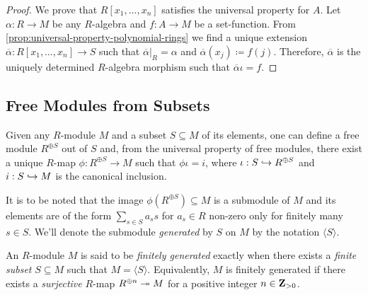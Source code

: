 \begin{proof}
    We prove that \(R[x_1, \dots, x_n]\) satisfies the universal property for
    \(A\). Let \(\alpha: R \to M\) be any \(R\)-algebra and \(f: A \to M\) be a
    set-function. From \cref{prop:universal-property-polynomial-rings} we find a
    unique extension \(\overline{\alpha}: R[x_1, \dots, x_n] \to S\) such that
    \(\overline{\alpha}|_R = \alpha\) and \(\overline{\alpha}(x_j) \coloneq
    f(j)\). Therefore, \(\overline{\alpha}\) is the uniquely determined
    \(R\)-algebra morphism such that \(\overline{\alpha} \iota = f\).
\end{proof}

\subsection{Free Modules from Subsets}

Given any \(R\)-module \(M\) and a subset \(S \subseteq M\) of its elements, one
can define a free module \(R^{\oplus S}\) out of \(S\) and, from the universal
property of free modules, there exist a unique \(R\)-map \(\phi: R^{\oplus S}
\to M\) such that \(\phi \iota = i\), where \(\iota: S \hookrightarrow R^{\oplus S}\) and
\(i: S \hookrightarrow M\) is the canonical inclusion.

It is to be noted that the image \(\phi(R^{\oplus S}) \subseteq M\) is a
submodule of \(M\) and its elements are of the form \(\sum_{s \in S} a_s s\) for
\(a_s \in R\) non-zero only for finitely many \(s \in S\). We'll denote the
submodule \emph{generated} by \(S\) on \(M\) by the notation
\(\langle S \rangle\).


\begin{definition}
    \label{def:finitely-generated-module}
    An \(R\)-module \(M\) is said to be \emph{finitely generated} exactly when there
    exists a \emph{finite subset} \(S \subseteq M\) such that
    \(M = \langle S \rangle\). Equivalently, \(M\) is finitely generated if there
    exists a \emph{surjective} \(R\)-map \(R^{\oplus n} \twoheadrightarrow M\) for a positive
    integer \(n \in \mathbf{Z}_{>0}\).
\end{definition}

